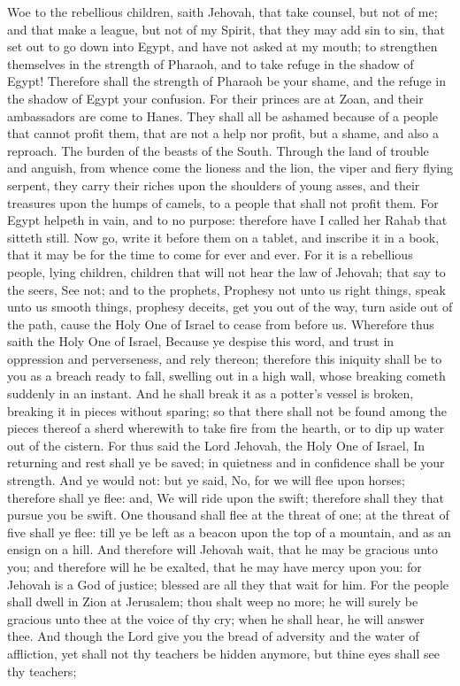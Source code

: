 Woe to the rebellious children, saith Jehovah, that take counsel, but not of me; and that make a league, but not of my Spirit, that they may add sin to sin, that set out to go down into Egypt, and have not asked at my mouth; to strengthen themselves in the strength of Pharaoh, and to take refuge in the shadow of Egypt! Therefore shall the strength of Pharaoh be your shame, and the refuge in the shadow of Egypt your confusion. For their princes are at Zoan, and their ambassadors are come to Hanes. They shall all be ashamed because of a people that cannot profit them, that are not a help nor profit, but a shame, and also a reproach.  The burden of the beasts of the South. Through the land of trouble and anguish, from whence come the lioness and the lion, the viper and fiery flying serpent, they carry their riches upon the shoulders of young asses, and their treasures upon the humps of camels, to a people that shall not profit them. For Egypt helpeth in vain, and to no purpose: therefore have I called her Rahab that sitteth still.  Now go, write it before them on a tablet, and inscribe it in a book, that it may be for the time to come for ever and ever. For it is a rebellious people, lying children, children that will not hear the law of Jehovah; that say to the seers, See not; and to the prophets, Prophesy not unto us right things, speak unto us smooth things, prophesy deceits, get you out of the way, turn aside out of the path, cause the Holy One of Israel to cease from before us. Wherefore thus saith the Holy One of Israel, Because ye despise this word, and trust in oppression and perverseness, and rely thereon; therefore this iniquity shall be to you as a breach ready to fall, swelling out in a high wall, whose breaking cometh suddenly in an instant. And he shall break it as a potter’s vessel is broken, breaking it in pieces without sparing; so that there shall not be found among the pieces thereof a sherd wherewith to take fire from the hearth, or to dip up water out of the cistern.  For thus said the Lord Jehovah, the Holy One of Israel, In returning and rest shall ye be saved; in quietness and in confidence shall be your strength. And ye would not: but ye said, No, for we will flee upon horses; therefore shall ye flee: and, We will ride upon the swift; therefore shall they that pursue you be swift. One thousand shall flee at the threat of one; at the threat of five shall ye flee: till ye be left as a beacon upon the top of a mountain, and as an ensign on a hill.  And therefore will Jehovah wait, that he may be gracious unto you; and therefore will he be exalted, that he may have mercy upon you: for Jehovah is a God of justice; blessed are all they that wait for him. For the people shall dwell in Zion at Jerusalem; thou shalt weep no more; he will surely be gracious unto thee at the voice of thy cry; when he shall hear, he will answer thee. And though the Lord give you the bread of adversity and the water of affliction, yet shall not thy teachers be hidden anymore, but thine eyes shall see thy teachers; 